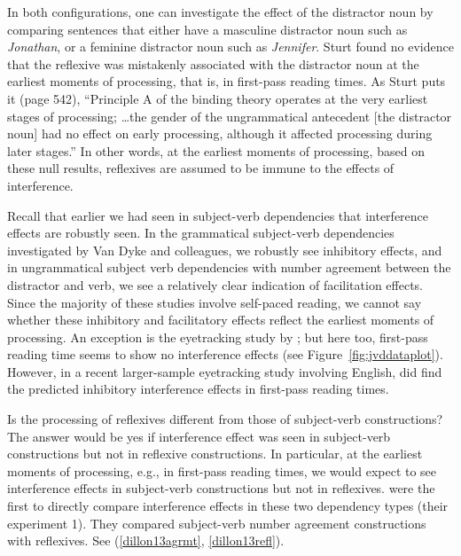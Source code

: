 \documentclass{cambridge7A}\usepackage[]{graphicx}\usepackage[]{color}
\begin{document}
In both  configurations, one can investigate the effect of the distractor noun by comparing sentences that either have a masculine distractor noun such as \textit{Jonathan},  or a feminine distractor noun  such as \textit{Jennifer}.  Sturt found no evidence that the reflexive was mistakenly associated with the distractor noun  at the earliest moments of processing, that is, in first-pass reading times.
As  Sturt puts it (page 542),  ``Principle A of the  binding theory operates at the very earliest stages of processing; \dots the gender of the ungrammatical antecedent [the distractor noun] had no effect on early processing, although it affected processing during later stages.''
In other words, at the earliest moments of processing, based on these  null results, reflexives are assumed to be immune to the effects of interference.

 Recall that earlier we had seen in subject-verb dependencies that interference effects are robustly seen.
 In the grammatical subject-verb dependencies investigated by Van Dyke and colleagues, we robustly see inhibitory effects, and 
in ungrammatical subject verb dependencies with number agreement between the distractor and verb, we see a relatively clear indication of facilitation effects. Since the majority of these studies involve self-paced reading, we cannot say whether these inhibitory and facilitatory effects reflect the earliest moments of processing. 
An exception is the eyetracking study by \cite{VanDyke2007}; but here too,  first-pass reading time seems to show no interference effects (see Figure~\ref{fig:jvddataplot}). However, in a recent larger-sample eyetracking study involving English, \cite{MertzenEtAlAMLaP2019} did find the predicted inhibitory interference effects in first-pass reading times.

Is the processing of  reflexives different from those of subject-verb constructions? The answer would be yes if interference effect was seen in subject-verb constructions but not in reflexive constructions. In particular, at the earliest moments of processing, e.g., in first-pass reading times, we would expect to see interference effects in  subject-verb constructions but not in reflexives. \cite{DillonMishlerSloggett2013} were the first to directly compare interference effects in these two dependency types  (their experiment 1).  They compared subject-verb number agreement constructions with reflexives. See (\ref{dillon13agrmt}, \ref{dillon13refl}).
\end{document}
